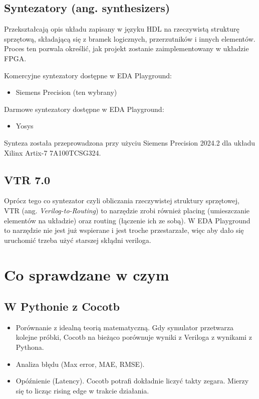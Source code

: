 \documentclass[12pt, a4paper, oneside]{scrreprt}
\begin{document}
\subsection{Syntezatory (ang. synthesizers)}
Przekształcają opis układu zapisany w języku HDL na rzeczywistą strukturę sprzętową,
składającą się z bramek logicznych, przerzutników i innych elementów.
Proces ten pozwala określić, jak projekt zostanie zaimplementowany w układzie FPGA.

Komercyjne syntezatory dostępne w EDA Playground:
\begin{itemize}
    \item Siemens Precision (ten wybrany)
\end{itemize}

Darmowe syntezatory dostępne w EDA Playground:
\begin{itemize}
    \item Yosys
\end{itemize}

Synteza została przeprowadzona przy użyciu Siemens Precision 2024.2 dla układu
Xilinx Artix-7 7A100TCSG324.

\subsection{VTR 7.0}
Oprócz tego co syntezator czyli obliczania rzeczywistej struktury sprzętowej,
VTR (ang. \textit{Verilog-to-Routing}) to narzędzie zrobi również
placing (umieszczanie elementów na układzie) oraz routing (łączenie ich ze sobą).
W EDA Playground to narzędzie nie jest już wspierane i jest troche przestarzałe, więc
aby dało się uruchomić trzeba użyć starszej skłądni veriloga.

\section{Co sprawdzane w czym}
\subsection{W Pythonie z Cocotb}
\begin{itemize}
\item Porównanie z idealną teorią matematyczną. Gdy symulator przetwarza kolejne próbki,
Cocotb na bieżąco porównuje wyniki z Veriloga z wynikami z Pythona.

\item Analiza błędu (Max error, MAE, RMSE). 

\item Opóźnienie (Latency). Cocotb potrafi dokładnie liczyć takty zegara.
Mierzy się to licząc rising edge w trakcie działania.

\end{itemize}
\end{document}
